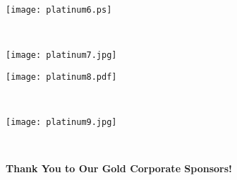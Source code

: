 \documentclass[twoside]{article}
\begin{document}
\begin{center}
        \hspace{2em}\begin{minipage}{0.45\textwidth}\begin{center}\vfill\begin{adjustbox}{max size={!}{0.116666666667\textheight}}\texttt{[image: platinum6.ps]}\end{adjustbox}\vfill\end{center}\end{minipage}
        \\
            \begin{minipage}{0.45\textwidth}\begin{center}\vfill\begin{adjustbox}{max size={!}{0.116666666667\textheight}}\texttt{[image: platinum7.jpg]}\end{adjustbox}\vfill\end{center}\end{minipage}
        \hspace{2em}\begin{minipage}{0.45\textwidth}\begin{center}\vfill\begin{adjustbox}{max size={!}{0.116666666667\textheight}}\texttt{[image: platinum8.pdf]}\end{adjustbox}\vfill\end{center}\end{minipage}
        \\
            \begin{minipage}{0.45\textwidth}\begin{center}\vfill\begin{adjustbox}{max size={!}{0.116666666667\textheight}}\texttt{[image: platinum9.jpg]}\end{adjustbox}\vfill\end{center}\end{minipage}
        \\
            \end{center}
    { \fontsize{16}{19}\selectfont \bf Thank You to Our Gold Corporate Sponsors!}
\end{document}
